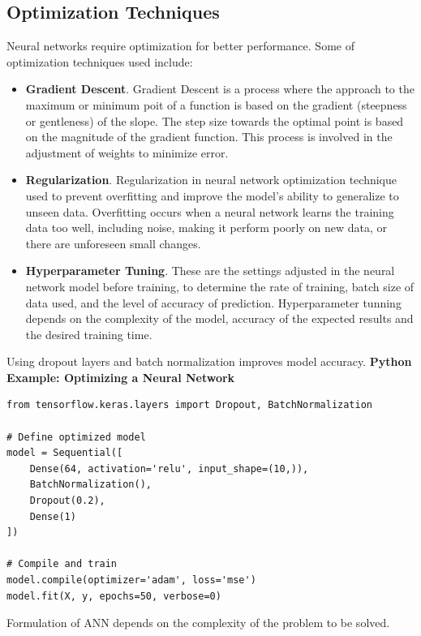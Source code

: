 \documentclass[12pt,a4paper]{article}
\begin{document}
\subsection{Optimization Techniques}
Neural networks require optimization for better performance. Some of optimization techniques used include:
\begin{itemize}
    \item \textbf{Gradient Descent}. Gradient Descent is a process where the approach to the maximum or minimum poit of a function is based on the gradient (steepness or gentleness) of the slope. The step size towards the optimal point is based on the magnitude of the gradient function. This process is involved in the adjustment of weights to minimize error.
    \item \textbf{Regularization}. Regularization in neural network optimization technique used to prevent overfitting and improve the model’s ability to generalize to unseen data. Overfitting occurs when a neural network learns the training data too well, including noise, making it perform poorly on new data, or there are unforeseen small changes.
    \item \textbf{Hyperparameter Tuning}. These are the settings adjusted in the neural network model before training, to determine the rate of training, batch size of data used, and the level of accuracy of prediction. Hyperparameter tunning depends on the complexity of the model, accuracy of the expected results and the desired training time.
\end{itemize}
\begin{example}
Using dropout layers and batch normalization improves model accuracy.
\bf{Python Example: Optimizing a Neural Network}
\begin{verbatim}
from tensorflow.keras.layers import Dropout, BatchNormalization

# Define optimized model
model = Sequential([
    Dense(64, activation='relu', input_shape=(10,)),
    BatchNormalization(),
    Dropout(0.2),
    Dense(1)
])

# Compile and train
model.compile(optimizer='adam', loss='mse')
model.fit(X, y, epochs=50, verbose=0)
\end{verbatim}
\end{example}
Formulation of ANN depends on the complexity of the problem to be solved.
\end{document}
